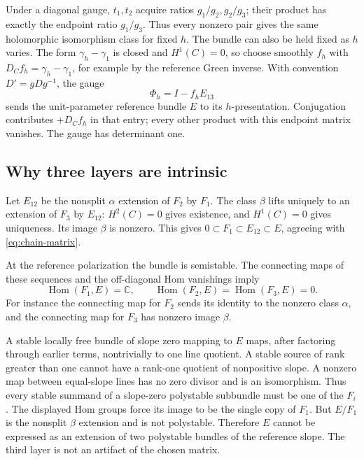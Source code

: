 \documentclass[11pt]{amsart}
\theoremstyle{definition}
\theoremstyle{remark}
\newcommand{\CC}{\mathbb C}
\newcommand{\Hom}{\operatorname{Hom}}
\begin{document}
Under a diagonal gauge, $t_1,t_2$ acquire ratios $g_1/g_2,g_2/g_3$;
their product has exactly the endpoint ratio $g_1/g_3$. Thus every
nonzero pair gives the same holomorphic isomorphism class for fixed $h$.
The bundle can also be held fixed as $h$ varies. The form
$\gamma_h-\gamma_1$ is closed and $H^1(C)=0$, so choose smoothly
$f_h$ with $D_Cf_h=\gamma_h-\gamma_1$, for example by the reference
Green inverse. With convention $D'=gDg^{-1}$, the gauge
\[
 \Phi_h=I-f_hE_{13}
\]
sends the unit-parameter reference bundle $E$ to its $h$-presentation.
Conjugation contributes $+D_Cf_h$ in that entry; every other product with
this endpoint matrix vanishes. The gauge has determinant one.

\subsection{Why three layers are intrinsic}
Let $E_{12}$ be the nonsplit $\alpha$ extension of $F_2$ by $F_1$.
The class $\beta$ lifts uniquely to an extension of $F_3$ by $E_{12}$:
$H^2(C)=0$ gives existence, and $H^1(C)=0$ gives uniqueness. Its image
$\beta$ is nonzero. This gives
$0\subset F_1\subset E_{12}\subset E$, agreeing with
\eqref{eq:chain-matrix}.

At the reference polarization the bundle is semistable. The connecting
maps of these sequences and the off-diagonal Hom vanishings imply
\[
 \Hom(F_1,E)=\CC,\qquad \Hom(F_2,E)=\Hom(F_3,E)=0.
\]
For instance the connecting map for $F_2$ sends its identity to the
nonzero class $\alpha$, and the connecting map for $F_3$ has nonzero
image $\beta$.

A stable locally free bundle of slope zero mapping to $E$ maps, after
factoring through earlier terms, nontrivially to one line quotient.
A stable source of rank greater than one cannot have a rank-one quotient
of nonpositive slope. A nonzero map between equal-slope lines has no zero
divisor and is an isomorphism. Thus every stable summand of a slope-zero
polystable subbundle must be one of the $F_i$. The displayed Hom groups
force its image to be the single copy of $F_1$. But $E/F_1$ is the
nonsplit $\beta$ extension and is not polystable. Therefore $E$ cannot
be expressed as an extension of two polystable bundles of the reference
slope. The third layer is not an artifact of the chosen matrix.
\end{document}
